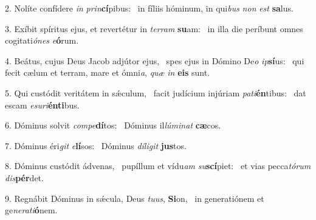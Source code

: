 2. Nolíte confídere \textit{in} \textit{prin}\textbf{cí}pibus: \ast\  in fíliis hóminum, in qui\textit{bus} \textit{non} \textit{est} \textbf{sa}lus.\

3. Exíbit spíritus ejus, et revertétur in \textit{ter}\textit{ram} \textbf{su}am: \ast\  in illa die períbunt omnes cogitati\textit{ó}\textit{nes} \textit{e}\textbf{ó}rum.\

4. Beátus, cujus Deus Jacob adjútor ejus, \dag\  spes ejus in Dómino De\textit{o} \textit{ip}\textbf{sí}us: \ast\  qui fecit cælum et terram, mare et ómni\textit{a}, \textit{quæ} \textit{in} \textbf{e}\textbf{is} sunt.\

5. Qui custódit veritátem in sǽculum, \dag\  facit judícium injúriam \textit{pa}\textit{ti}\textbf{én}tibus: \ast\  dat escam \textit{e}\textit{su}\textit{ri}\textbf{én}\textbf{ti}bus.\

6. Dóminus solvit \textit{com}\textit{pe}\textbf{dí}tos: \ast\  Dóminus il\textit{lú}\textit{mi}\textit{nat} \textbf{cæ}cos.\

7. Dóminus éri\textit{git} \textit{e}\textbf{lí}sos: \ast\  Dóminus \textit{dí}\textit{li}\textit{git} \textbf{jus}tos.\

8. Dóminus custódit ádvenas, \dag\  pupíllum et vídu\textit{am} \textit{su}\textbf{scí}piet: \ast\  et vias pecca\textit{tó}\textit{rum} \textit{dis}\textbf{pér}det.\

9. Regnábit Dóminus in sǽcula, Deus \textit{tu}\textit{us}, \textbf{Si}on, \ast\  in generatiónem et ge\textit{ne}\textit{ra}\textit{ti}\textbf{ó}nem.\

